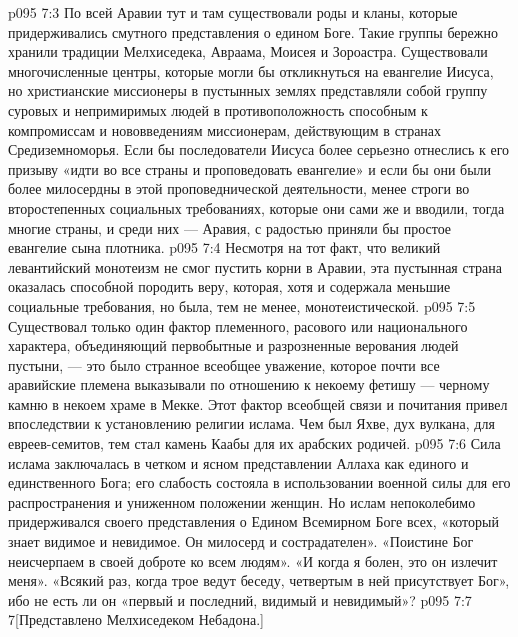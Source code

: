 \vs p095 7:3 По всей Аравии тут и там существовали роды и кланы, которые придерживались смутного представления о едином Боге. Такие группы бережно хранили традиции Мелхиседека, Авраама, Моисея и Зороастра. Существовали многочисленные центры, которые могли бы откликнуться на евангелие Иисуса, но христианские миссионеры в пустынных землях представляли собой группу суровых и непримиримых людей в противоположность способным к компромиссам и нововведениям миссионерам, действующим в странах Средиземноморья. Если бы последователи Иисуса более серьезно отнеслись к его призыву «идти во все страны и проповедовать евангелие» и если бы они были более милосердны в этой проповеднической деятельности, менее строги во второстепенных социальных требованиях, которые они сами же и вводили, тогда многие страны, и среди них --- Аравия, с радостью приняли бы простое евангелие сына плотника.
\vs p095 7:4 Несмотря на тот факт, что великий левантийский монотеизм не смог пустить корни в Аравии, эта пустынная страна оказалась способной породить веру, которая, хотя и содержала меньшие социальные требования, но была, тем не менее, монотеистической.
\vs p095 7:5 Существовал только один фактор племенного, расового или национального характера, объединяющий первобытные и разрозненные верования людей пустыни, --- это было странное всеобщее уважение, которое почти все аравийские племена выказывали по отношению к некоему фетишу --- черному камню в некоем храме в Мекке. Этот фактор всеобщей связи и почитания привел впоследствии к установлению религии ислама. Чем был Яхве, дух вулкана, для евреев\hyp{}семитов, тем стал камень Каабы для их арабских родичей.
\vs p095 7:6 Сила ислама заключалась в четком и ясном представлении Аллаха как единого и единственного Бога; его слабость состояла в использовании военной силы для его распространения и униженном положении женщин. Но ислам непоколебимо придерживался своего представления о Едином Всемирном Боге всех, «который знает видимое и невидимое. Он милосерд и сострадателен». «Поистине Бог неисчерпаем в своей доброте ко всем людям». «И когда я болен, это он излечит меня». «Всякий раз, когда трое ведут беседу, четвертым в ней присутствует Бог», ибо не есть ли он «первый и последний, видимый и невидимый»?
\vs p095 7:7 7[Представлено Мелхиседеком Небадона.]
